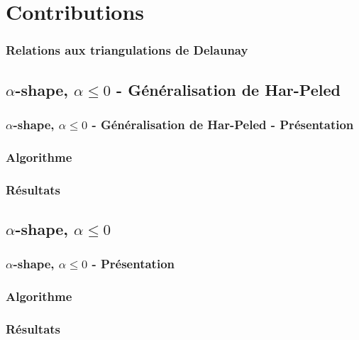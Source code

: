 \section{Contributions}

\begin{frame}
\frametitle{Relations aux triangulations de Delaunay}

\end{frame}

\subsection{$\alpha$-shape, $\alpha \leq 0$ - Généralisation de Har-Peled}

\begin{frame}
\frametitle{$\alpha$-shape, $\alpha \leq 0$ - Généralisation de Har-Peled - Présentation}

\end{frame}

\begin{frame}
\frametitle{Algorithme}

\end{frame}

\begin{frame}
\frametitle{Résultats}

\end{frame}

\subsection{$\alpha$-shape, $\alpha \leq 0$}

\begin{frame}
\frametitle{$\alpha$-shape, $\alpha \leq 0$ - Présentation}

\end{frame}

\begin{frame}
\frametitle{Algorithme}

\end{frame}

\begin{frame}
\frametitle{Résultats}

\end{frame}


